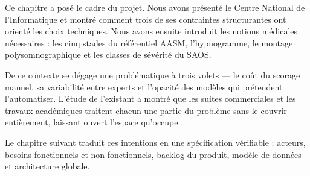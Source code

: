 
Ce chapitre a posé le cadre du projet. Nous avons présenté le Centre National de
l'Informatique et montré comment trois de ses contraintes structurantes ont orienté les
choix techniques. Nous avons ensuite introduit les notions médicales nécessaires : les
cinq stades du référentiel AASM, l'hypnogramme, le montage polysomnographique et les
classes de sévérité du SAOS.

De ce contexte se dégage une problématique à trois volets --- le coût du scorage manuel,
sa variabilité entre experts et l'opacité des modèles qui prétendent l'automatiser.
L'étude de l'existant a montré que les suites commerciales et les travaux académiques
traitent chacun une partie du problème sans le couvrir entièrement, laissant ouvert
l'espace qu'occupe \hypnoria{}.

Le chapitre suivant traduit ces intentions en une spécification vérifiable : acteurs,
besoins fonctionnels et non fonctionnels, backlog du produit, modèle de données et
architecture globale.
